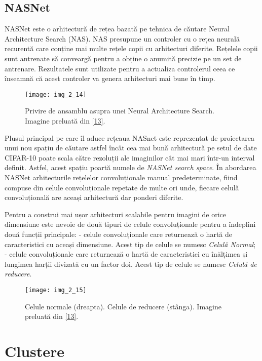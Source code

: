 \subsection{NASNet}
NASNet este o arhitectură de rețea bazată pe tehnica de căutare Neural Architecture Search (NAS). NAS presupune un controler cu o rețea neurală recurentă care conține mai multe rețele copii cu arhitecturi diferite. Rețelele copii sunt antrenate să conveargă pentru a obține o anumită precizie pe un set de antrenare. Rezultatele sunt utilizate pentru a actualiza controlerul ceea ce înseamnă că acest controler va genera arhitecturi mai bune în timp.

\begin{figure}[!h]
	\centering
	\texttt{[image: img\_2\_14]}
	\caption[NAS]{Privire de ansamblu asupra unei Neural Architecture Search. Imagine preluată din \hyperlink{Zoph2018LearningTA}{[13]}.}
\end{figure}  

Plusul principal pe care îl aduce rețeaua NASnet este reprezentat de proiectarea unui nou spațiu de căutare astfel încât cea mai bună arhitectură pe setul de date CIFAR-10 poate scala către rezoluții ale imaginilor cât mai mari într-un interval definit. Astfel, acest spațiu poartă numele de \textit{NASNet search space}. În abordarea NASNet arhitecturile rețelelor convoluționale manual predeterminate, fiind compuse din celule convoluționale repetate de multe ori unde, fiecare celulă convoluțională are aceași arhitectură dar ponderi diferite.

Pentru a construi mai ușor arhitecturi scalabile pentru imagini de orice dimensiune este nevoie de două tipuri de celule convoluționale pentru a îndeplini două funcții principale: - celule convoluționale care returnează o hartă de caracteristici cu aceași dimensiune. Acest tip de celule se numesc \textit{Celulă Normal}; - celule convoluționale care returnează o hartă de caracteristici cu înălțimea și lungimea harții divizată cu un factor doi. Acest tip de celule se numesc \textit{Celulă de reducere}.

\begin{figure}[!h]
	\centering
	\texttt{[image: img\_2\_15]}
	\caption[Celule normale și de reducere]{Celule normale (dreapta). Celule de reducere (stânga). Imagine preluată din \hyperlink{Zoph2018LearningTA}{[13]}.}
\end{figure}  

\section{Clustere}

